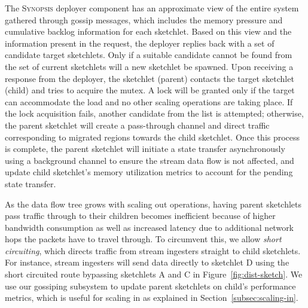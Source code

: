 The \textsc{Synopsis} deployer component has an approximate view of the entire system gathered through gossip messages, which includes the memory pressure and cumulative backlog information for each sketchlet.
Based on this view and the information present in the request, the deployer replies back with a set of candidate target sketchlets.
Only if a suitable candidate cannot be found from the set of current sketchlets will a new sketchlet be spawned.
Upon receiving a response from the deployer, the sketchlet (parent) contacts the target sketchlet (child) and tries to acquire the mutex.
A lock will be granted only if the target can accommodate the load and no other scaling operations are taking place.
If the lock acquisition fails, another candidate from the list is attempted; otherwise, the parent sketchlet will create a pass-through channel and direct traffic corresponding to migrated regions towards the child sketchlet.
Once this process is complete, the parent sketchlet will initiate a state transfer asynchronously using a background channel to ensure the stream data flow is not affected, and update child sketchlet's memory utilization metrics to account for the pending state transfer.

As the data flow tree grows with scaling out operations, having parent sketchlets pass traffic through to their children becomes inefficient because of higher bandwidth consumption as well as increased latency due to additional network hops the packets have to travel through.
To circumvent this, we allow \emph{short circuiting}, which directs traffic from stream ingesters straight to child sketchlets.
For instance, stream ingesters will send data directly to sketchlet D using the short circuited route bypassing sketchlets A and C in Figure~\ref{fig:dist-sketch}. 
We use our gossiping subsystem to update parent sketchlets on child's performance metrics, which is useful for scaling in as explained in Section~\ref{subsec:scaling-in}.

